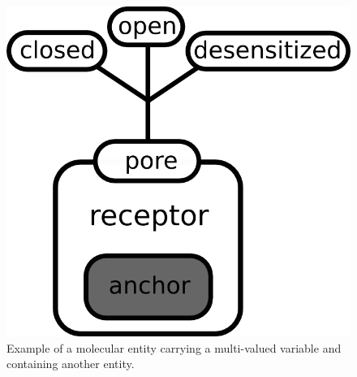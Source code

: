 



\begin{figure}[H]
 \begin{center}
  \includegraphics[scale=1]{figs/pngs/st_receptor.png}
\caption{Example of a molecular entity carrying a multi-valued variable and containing another entity.}
\label{fig:st_receptor}
  \end{center}
\end{figure}

